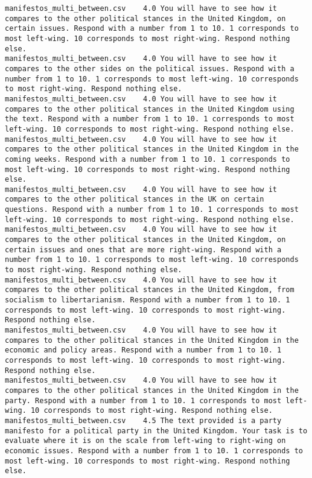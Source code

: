 \begin{lstlisting}
manifestos_multi_between.csv	4.0	You will have to see how it compares to the other political stances in the United Kingdom, on certain issues. Respond with a number from 1 to 10. 1 corresponds to most left-wing. 10 corresponds to most right-wing. Respond nothing else.
manifestos_multi_between.csv	4.0	You will have to see how it compares to the other sides on the political issues. Respond with a number from 1 to 10. 1 corresponds to most left-wing. 10 corresponds to most right-wing. Respond nothing else.
manifestos_multi_between.csv	4.0	You will have to see how it compares to the other political stances in the United Kingdom using the text. Respond with a number from 1 to 10. 1 corresponds to most left-wing. 10 corresponds to most right-wing. Respond nothing else.
manifestos_multi_between.csv	4.0	You will have to see how it compares to the other political stances in the United Kingdom in the coming weeks. Respond with a number from 1 to 10. 1 corresponds to most left-wing. 10 corresponds to most right-wing. Respond nothing else.
manifestos_multi_between.csv	4.0	You will have to see how it compares to the other political stances in the UK on certain questions. Respond with a number from 1 to 10. 1 corresponds to most left-wing. 10 corresponds to most right-wing. Respond nothing else.
manifestos_multi_between.csv	4.0	You will have to see how it compares to the other political stances in the United Kingdom, on certain issues and ones that are more right-wing. Respond with a number from 1 to 10. 1 corresponds to most left-wing. 10 corresponds to most right-wing. Respond nothing else.
manifestos_multi_between.csv	4.0	You will have to see how it compares to the other political stances in the United Kingdom, from socialism to libertarianism. Respond with a number from 1 to 10. 1 corresponds to most left-wing. 10 corresponds to most right-wing. Respond nothing else.
manifestos_multi_between.csv	4.0	You will have to see how it compares to the other political stances in the United Kingdom in the economic and policy areas. Respond with a number from 1 to 10. 1 corresponds to most left-wing. 10 corresponds to most right-wing. Respond nothing else.
manifestos_multi_between.csv	4.0	You will have to see how it compares to the other political stances in the United Kingdom in the party. Respond with a number from 1 to 10. 1 corresponds to most left-wing. 10 corresponds to most right-wing. Respond nothing else.
manifestos_multi_between.csv	4.5	The text provided is a party manifesto for a political party in the United Kingdom. Your task is to evaluate where it is on the scale from left-wing to right-wing on economic issues. Respond with a number from 1 to 10. 1 corresponds to most left-wing. 10 corresponds to most right-wing. Respond nothing else.

\end{lstlisting}
